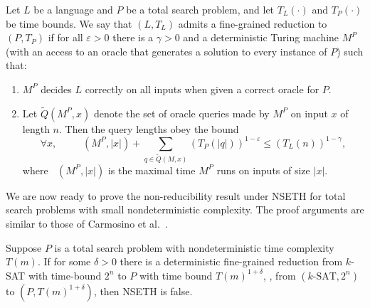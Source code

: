 \documentclass{toc}
\theoremstyle{plain}
\newcommand{\NSETH}{NSETH\xspace}
\DeclareMathOperator{\THALT}{\mathsf{T_{HALT}}}
\newcommand\eps{\varepsilon}
\providecommand{\card}[1]{\lvert#1\rvert}
\begin{document}
\begin{definition}
Let $L$ be a language and $P$ be a total search problem, and let $T_L(\cdot)$ and $T_P(\cdot)$ be time bounds. We say that $(L,T_L)$ admits a fine-grained reduction to $(P,T_P)$ if for all $\eps>0$ there is a $\gamma>0$ and a deterministic Turing machine $M^P$ (with an access to an oracle that generates a solution to every instance of $P$) such that:

\begin{enumerate}
\item \label{itit:a}
	$M^P$ decides $L$ correctly on all inputs when given a correct oracle for $P$.
\item \label{itit:b}
  Let %
$\widetilde{Q}(M^P,x)$    %
denote the set of oracle queries made by $M^P$ on input $x$ of length $n$. Then the query lengths obey the bound
%
$$
\forall x, \qquad
\THALT(M^P,\card{x}) + \sum_{q\in \widetilde{Q}(M,x)}(T_P(\card{q}))^{1-\varepsilon}
\leq(T_L(n))^{1-\gamma},
$$
where $\THALT(M^P,\card{x})$ is the maximal time $M^P$ runs on  inputs of size $\card{x}$.
\end{enumerate}
\end{definition}
We are now ready to prove the non-reducibility result under \NSETH for total search problems with small nondeterministic complexity. The proof
arguments are similar to those of Carmosino et al.~\cite{carmosino2016nondeterministic}.

\begin{theorem}\label{nondet:if}
Suppose $P$ is a total search problem with nondeterministic time complexity $T(m)$.
If for some $\delta>0$ there is a deterministic fine-grained reduction from $k$-SAT with time-bound $2^n$ to $P$ with time bound $T(m)^{1+\delta}$, \ie, from $(k\text{-SAT},2^n)$ to $(P,T(m)^{1+\delta})$, then \NSETH is false.
\end{theorem}
\end{document}
